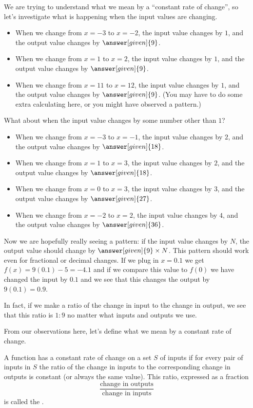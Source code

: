 \documentclass{ximera}
\begin{document}
\begin{example}
We are trying to understand what we mean by a ``constant rate of change'', so let's investigate what is happening when the input values are changing. 
\begin{itemize}
\item When we change from $x=-3$ to $x=-2$, the input value changes by $1$, and the output value changes by $\answer[given]{9}$. 
\item When we change from $x=1$ to $x=2$, the input value changes by $1$, and the output value changes by $\answer[given]{9}$.
\item When we change from $x=11$ to $x=12$, the input value changes by $1$, and the output value changes by $\answer[given]{9}$. (You may have to do some extra calculating here, or you might have observed a pattern.)
\end{itemize}
What about when the input value changes by some number other than $1$?
\begin{itemize}
\item When we change from $x=-3$ to $x=-1$, the input value changes by $2$, and the output value changes by $\answer[given]{18}$. 
\item When we change from $x=1$ to $x=3$, the input value changes by $2$, and the output value changes by $\answer[given]{18}$.
\item When we change from $x=0$ to $x=3$, the input value changes by $3$, and the output value changes by $\answer[given]{27}$. 
\item When we change from $x=-2$ to $x=2$, the input value changes by $4$, and the output value changes by $\answer[given]{36}$. 
\end{itemize}
Now we are hopefully really seeing a pattern: if the input value changes by $N$, the output value should change by $\answer[given]{9} \times N$. This pattern should work even for fractional or decimal changes. If we plug in $x=0.1$ we get $f(x) = 9(0.1)-5 = -4.1$ and if we compare this value to $f(0)$ we have changed the input by $0.1$ and we see that this changes the output by $9(0.1) = 0.9$.

In fact, if we make a ratio of the change in input to the change in output, we see that this ratio is $1:9$ no matter what inputs and outputs we use.

\end{example}
From our observations here, let's define what we mean by a constant rate of change.
\begin{definition}
A function has a constant rate of change on a set $S$ of inputs if for every pair of inputs in $S$ the ratio of the change in inputs to the corresponding change in outputs is constant (or always the same value). This ratio, expressed as a fraction 
\[
\frac{\textrm{change in outputs}}{\textrm{change in inputs}}
\]
is called the .
\end{definition}
\end{document}
